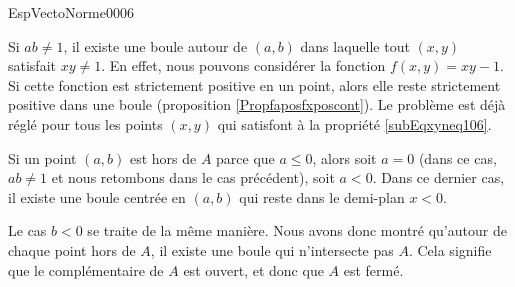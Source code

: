 \begin{corrige}{EspVectoNorme0006}
\begin{description}
	Si $ab\neq 1$, il existe une boule autour de $(a,b)$ dans laquelle tout $(x,y)$ satisfait $xy\neq 1$. En effet, nous pouvons considérer la fonction $f(x,y)=xy-1$. Si cette fonction est strictement positive en un point, alors elle reste strictement positive dans une boule (proposition \ref{Propfaposfxposcont}). Le problème est déjà réglé pour tous les points $(x,y)$ qui satisfont à la propriété \eqref{subEqxyneq106}. 

	Si un point $(a,b)$ est hors de $A$ parce que $a\leq 0$, alors soit $a=0$ (dans ce cas, $ab\neq 1$ et nous retombons dans le cas précédent), soit $a<0$. Dans ce dernier cas, il existe une boule centrée en $(a,b)$ qui reste dans le demi-plan $x<0$.

	Le cas $b<0$ se traite de la même manière. Nous avons donc montré qu'autour de chaque point hors de $A$, il existe une boule qui n'intersecte pas $A$. Cela signifie que le complémentaire de $A$ est ouvert, et donc que $A$ est fermé.

  \end{description}
\end{corrige}
